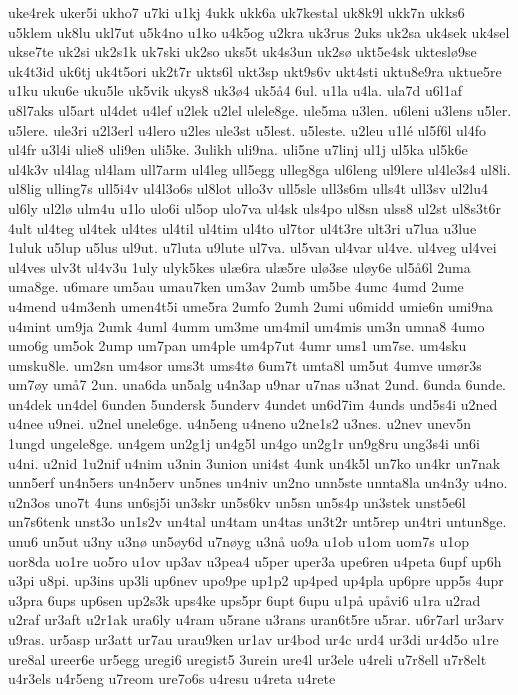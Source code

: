 {uke4rek
uker5i
ukho7
u7ki
u1kj
4ukk
ukk6a
uk7kestal
uk8k9l
ukk7n
ukks6
u5klem
uk8lu
ukl7ut
u5k4no
u1ko
u4k5og
u2kra
uk3rus
2uks
uk2sa
uk4sek
uk4sel
ukse7te
uk2si
uk2s1k
uk7ski
uk2so
uks5t
uk4s3un
uk2sø
ukt5e4sk
ukteslø9se
uk4t3id
uk6tj
uk4t5ori
uk2t7r
ukts6l
ukt3sp
ukt9s6v
ukt4sti
uktu8e9ra
uktue5re
u1ku
uku6e
uku5le
uk5vik
ukys8
uk3ø4
uk5å4
6ul.
u1la
u4la.
ula7d
u6l1af
u8l7aks
ul5art
ul4det
u4lef
u2lek
u2lel
ulele8ge.
ule5ma
u3len.
u6leni
u3lens
u5ler.
u5lere.
ule3ri
u2l3erl
u4lero
u2les
ule3st
u5lest.
u5leste.
u2leu
u1lé
ul5f6l
ul4fo
ul4fr
u3l4i
ulie8
uli9en
uli5ke.
3ulikh
uli9na.
uli5ne
u7linj
ul1j
ul5ka
ul5k6e
ul4k3v
ul4lag
ul4lam
ull7arm
ul4leg
ull5egg
ulleg8ga
ul6leng
ul9lere
ul4le3s4
ul8li.
ul8lig
ulling7s
ull5i4v
ul4l3o6s
ul8lot
ullo3v
ull5sle
ull3s6m
ulls4t
ull3sv
ul2lu4
ul6ly
ul2lø
ulm4u
u1lo
ulo6i
ul5op
ulo7va
ul4sk
uls4po
ul8sn
ulss8
ul2st
ul8s3t6r
4ult
ul4teg
ul4tek
ul4tes
ul4til
ul4tim
ul4to
ul7tor
ul4t3re
ult3ri
u7lua
u3lue
1uluk
u5lup
u5lus
ul9ut.
u7luta
u9lute
ul7va.
ul5van
ul4var
ul4ve.
ul4veg
ul4vei
ul4ves
ulv3t
ul4v3u
1uly
ulyk5kes
ulæ6ra
ulæ5re
ulø3se
uløy6e
ul5å6l
2uma
uma8ge.
u6mare
um5au
umau7ken
um3av
2umb
um5be
4umc
4umd
2ume
u4mend
u4m3enh
umen4t5i
ume5ra
2umfo
2umh
2umi
u6midd
umie6n
umi9na
u4mint
um9ja
2umk
4uml
4umm
um3me
um4mil
um4mis
um3n
umna8
4umo
umo6g
um5ok
2ump
um7pan
um4ple
um4p7ut
4umr
ums1
um7se.
um4sku
umsku8le.
um2sn
um4sor
ums3t
ums4tø
6um7t
umta8l
um5ut
4umve
umør3s
um7øy
umå7
2un.
una6da
un5alg
u4n3ap
u9nar
u7nas
u3nat
2und.
6unda
6unde.
un4dek
un4del
6unden
5undersk
5underv
4undet
un6d7im
4unds
und5s4i
u2ned
u4nee
u9nei.
u2nel
unele6ge.
u4n5eng
u4neno
u2ne1s2
u3nes.
u2nev
unev5n
1ungd
ungele8ge.
un4gem
un2g1j
un4g5l
un4go
un2g1r
un9g8ru
ung3s4i
un6i
u4ni.
u2nid
1u2nif
u4nim
u3nin
3union
uni4st
4unk
un4k5l
un7ko
un4kr
un7nak
unn5erf
un4n5ers
un4n5erv
un5nes
un4niv
un2no
unn5ste
unnta8la
un4n3y
u4no.
u2n3os
uno7t
4uns
un6sj5i
un3skr
un5s6kv
un5sn
un5s4p
un3stek
unst5e6l
un7s6tenk
unst3o
un1s2v
un4tal
un4tam
un4tas
un3t2r
unt5rep
un4tri
untun8ge.
unu6
un5ut
u3ny
u3nø
un5øy6d
u7nøyg
u3nå
uo9a
u1ob
u1om
uom7s
u1op
uor8da
uo1re
uo5ro
u1ov
up3av
u3pea4
u5per
uper3a
upe6ren
u4peta
6upf
up6h
u3pi
u8pi.
up3ins
up3li
up6nev
upo9pe
up1p2
up4ped
up4pla
up6pre
upp5s
4upr
u3pra
6ups
up6sen
up2s3k
ups4ke
ups5pr
6upt
6upu
u1på
upåvi6
u1ra
u2rad
u2raf
ur3aft
u2r1ak
ura6ly
u4ram
u5rane
u3rans
uran6t5re
u5rar.
u6r7arl
ur3arv
u9ras.
ur5asp
ur3att
ur7au
urau9ken
ur1av
ur4bod
ur4c
urd4
ur3di
ur4d5o
u1re
ure8al
ureer6e
ur5egg
uregi6
uregist5
3urein
ure4l
ur3ele
u4reli
u7r8ell
u7r8elt
u4r3els
u4r5eng
u7reom
ure7o6s
u4resu
u4reta
u4rete
}
